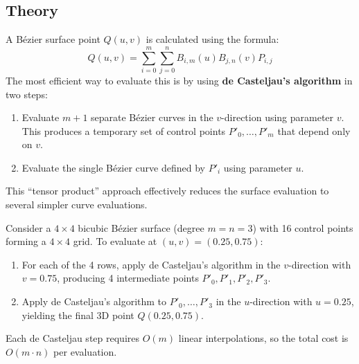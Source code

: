 \subsection{Theory}
A B\'ezier surface point $Q(u, v)$ is calculated using the formula:
$$Q(u, v) = \sum_{i=0}^m \sum_{j=0}^n B_{i,m}(u) B_{j,n}(v) P_{i,j}$$
The most efficient way to evaluate this is by using \textbf{de Casteljau's algorithm}\cite{farin2002} in two steps:
\begin{enumerate}
\item Evaluate $m+1$ separate B\'ezier curves in the $v$-direction using parameter $v$. This produces a temporary set of control points $P'_0, \dots, P'_m$ that depend only on $v$.
\item Evaluate the single B\'ezier curve defined by $P'_i$ using parameter $u$.
\end{enumerate}

This ``tensor product'' approach effectively reduces the surface evaluation to several simpler curve evaluations.

\begin{example}\label{ex:bezier_surface}
Consider a $4 \times 4$ bicubic B\'ezier surface (degree $m = n = 3$) with 16 control points forming a $4 \times 4$ grid. To evaluate at $(u, v) = (0.25, 0.75)$:
\begin{enumerate}
    \item For each of the 4 rows, apply de Casteljau's algorithm in the $v$-direction with $v = 0.75$, producing 4 intermediate points $P'_0, P'_1, P'_2, P'_3$.
    \item Apply de Casteljau's algorithm to $P'_0, \ldots, P'_3$ in the $u$-direction with $u = 0.25$, yielding the final 3D point $Q(0.25, 0.75)$.
\end{enumerate}
Each de Casteljau step requires $O(m)$ linear interpolations, so the total cost is $O(m \cdot n)$ per evaluation.
\end{example}



